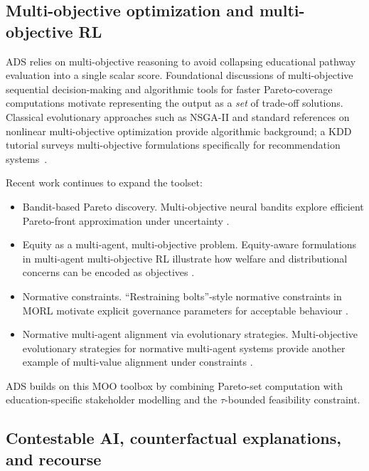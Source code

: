 \documentclass[sigconf,review]{acmart}
\begin{document}
\subsection{Multi-objective optimization and multi-objective RL}
\label{sec:rw-moo}

ADS relies on multi-objective reasoning to avoid collapsing educational pathway evaluation into a single scalar score.
Foundational discussions of multi-objective sequential decision-making \cite{roijers2013survey_mosdm} and algorithmic tools for faster Pareto-coverage computations \cite{roijers2015convex} motivate representing the output as a \emph{set} of trade-off solutions.
Classical evolutionary approaches such as NSGA-II \cite{deb2002nsga2} and standard references on nonlinear multi-objective optimization \cite{miettinen1999nonlinearMOO} provide algorithmic background; a KDD tutorial surveys multi-objective formulations specifically for recommendation systems~\cite{zheng2021multiobjective}.

Recent work continues to expand the toolset:
\begin{itemize}
    \item {Bandit-based Pareto discovery.} Multi-objective neural bandits explore efficient Pareto-front approximation under uncertainty \cite{monb2025}.
    \item {Equity as a multi-agent, multi-objective problem.} Equity-aware formulations in multi-agent multi-objective RL illustrate how welfare and distributional concerns can be encoded as objectives \cite{equityMAMORL2025}.
    \item {Normative constraints.} ``Restraining bolts''-style normative constraints in MORL motivate explicit governance parameters for acceptable behaviour \cite{restrainingBolts2025}.
    \item {Normative multi-agent alignment via evolutionary strategies.} Multi-objective evolutionary strategies for normative multi-agent systems provide another example of multi-value alignment under constraints \cite{riad2025nova}.
\end{itemize}

\noindent
ADS builds on this MOO toolbox by combining Pareto-set computation with education-specific stakeholder modelling and the $\tau$-bounded feasibility constraint.

\subsection{Contestable AI, counterfactual explanations, and recourse}
\label{sec:rw-contestable}
\end{document}
